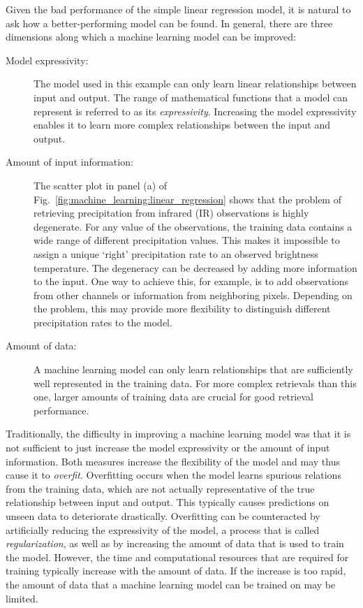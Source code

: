 Given the bad performance of the simple linear regression model, it is natural
to ask how a better-performing model can be found. In general, there are three
dimensions along which a machine learning model can be improved:
\begin{description}
\item[Model expressivity:] The model used in this example can only learn
  linear relationships between input and output. The range of mathematical functions
  that a model can represent is referred to as its \textit{expressivity}. Increasing
  the model expressivity enables it to learn  more complex relationships between
  the input and output.
\item[Amount of input information:] The scatter plot in panel (a) of
  Fig.~\ref{fig:machine_learning:linear_regression} shows that the problem of
  retrieving precipitation from infrared (IR) observations is highly degenerate. For any
  value of the observations, the training data contains a wide range of different precipitation
  values. This makes it impossible to assign a unique `right' precipitation rate
  to an observed brightness temperature. The degeneracy can be decreased by
  adding more information to the input. One way to achieve this, for example, is
  to add observations from other channels or information from neighboring
  pixels. Depending on the problem, this may provide  more flexibility
  to distinguish different precipitation rates to the model.
\item[Amount of data:] A machine learning model can only learn relationships
  that are sufficiently well represented in the training data. For more complex
  retrievals than this one, larger amounts of training data are crucial for good
  retrieval performance.
\end{description}

Traditionally, the difficulty in improving a machine learning model was that it
is not sufficient to just increase the model expressivity or the amount of input
information. Both measures increase the flexibility of the model and may
thus cause it to \textit{overfit}. Overfitting occurs when the
model learns spurious relations from the training data, which are not actually
representative of the true relationship between input and output. This typically
causes predictions on unseen data to deteriorate drastically. Overfitting can be
counteracted by artificially reducing the expressivity of the model, a process
that is called \textit{regularization}, as well as by increasing the amount of data
that is used to train the model. However, the time and computational resources
that are required for training typically increase with the amount of data. If
the  increase is too rapid, the amount of data that a machine learning model
can be trained on may be limited.

